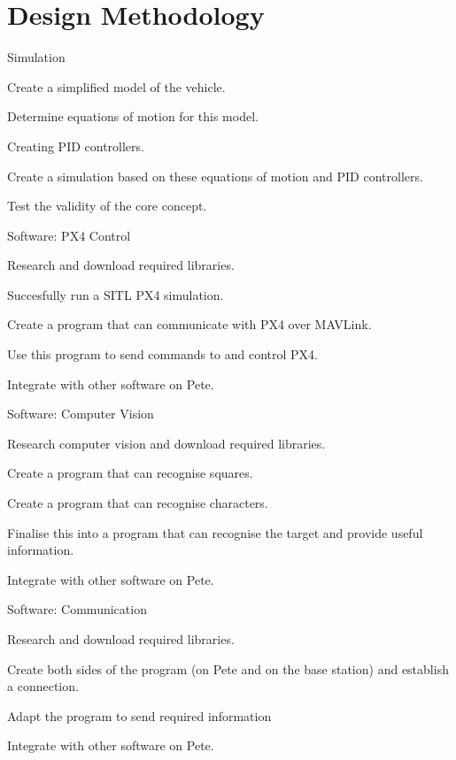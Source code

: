 \documentclass[11pt]{article}
\begin{document}
\section{Design Methodology}
\begin{compactitem}
    \item Simulation
    \begin{compactenum}
        \item Create a simplified model of the vehicle.
        \item Determine equations of motion for this model.
        \item Creating PID controllers.
        \item Create a simulation based on these equations of motion and PID controllers.
        \item Test the validity of the core concept.
    \end{compactenum}
    \item Software: PX4 Control
    \begin{compactenum}
        \item Research and download required libraries.
        \item Succesfully run a SITL PX4 simulation.
        \item Create a program that can communicate with PX4 over MAVLink.
        \item Use this program to send commands to and control PX4.
        \item Integrate with other software on Pete.
    \end{compactenum}
    \item Software: Computer Vision
    \begin{compactenum}
        \item Research computer vision and download required libraries.
        \item Create a program that can recognise squares.
        \item Create a program that can recognise characters.
        \item Finalise this into a program that can recognise the target and provide useful information.
        \item Integrate with other software on Pete.
    \end{compactenum}
    \item Software: Communication
    \begin{compactenum}
        \item Research and download required libraries.
        \item Create both sides of the program (on Pete and on the base station) and establish a connection.
        \item Adapt the program to send required information
        \item Integrate with other software on Pete.
    \end{compactenum}

\end{compactitem}
\end{document}
